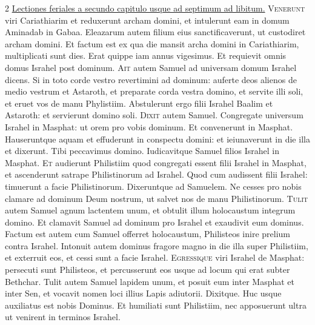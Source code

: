 \begin{multicols*}{2}
\newline \ul{Lectiones feriales a secundo capitulo usque ad septimum ad libitum.}
{\color{Red} }
\lettrine[lines=2]{\zallmancaps \color{Blue} V}{enerunt} viri Cariathiarim et reduxerunt archam domini, et intulerunt eam in domum Aminadab in Gabaa. Eleazarum autem filium eius sanctificaverunt, ut custodiret archam domini. Et factum est ex qua die mansit archa domini in Cariathiarim, multiplicati sunt dies. Erat quippe iam annus vigesimus. Et requievit omnis domus Israhel post dominum.%
\lettrine[lines=2]{\zallmancaps \color{Red} A}{it} autem Samuel ad universam domum Israhel dicens. Si in toto corde vestro revertimini ad dominum: auferte deos alienos de medio vestrum et Astaroth, et preparate corda vestra domino, et servite illi soli, et eruet vos de manu Phylistiim. Abstulerunt ergo filii Israhel Baalim et Astaroth: et servierunt domino soli.
\lettrine[lines=2]{\zallmancaps \color{Blue} D}{ixit} autem Samuel. Congregate universum Israhel in Masphat: ut orem pro vobis dominum. Et convenerunt in Masphat. Hauseruntque aquam et effuderunt in conspectu domini: et ieiunaverunt in die illa et dixerunt. Tibi peccavimus domino. Iudicavitque Samuel filios Israhel in Masphat.
\lettrine[lines=2]{\zallmancaps \color{Red} E}{t} audierunt Philistiim quod congregati essent filii Israhel in Masphat, et ascenderunt satrape Philistinorum ad Israhel. Quod cum audissent filii Israhel: timuerunt a facie Philistinorum. Dixeruntque ad Samuelem. Ne cesses pro nobis clamare ad dominum Deum nostrum, ut salvet nos de manu Philistinorum.
\lettrine[lines=2]{\zallmancaps \color{Blue} T}{ulit} autem Samuel agnum lactentem unum, et obtulit illum holocaustum integrum domino. Et clamavit Samuel ad dominum pro Israhel et exaudivit eum dominus. Factum est autem cum Samuel offerret holocaustum, Philisteos inire prelium contra Israhel. Intonuit autem dominus fragore magno in die illa super Philistiim, et exterruit eos, et cessi sunt a facie Israhel.
\lettrine[lines=2]{\zallmancaps \color{Red} E}{gressique} viri Israhel de Masphat: persecuti sunt Philisteos, et percusserunt eos usque ad locum qui erat subter Bethchar. Tulit autem Samuel lapidem unum, et posuit eum inter Masphat et inter Sen, et vocavit nomen loci illius Lapis adiutorii. Dixitque. Huc usque auxiliatus est nobis Dominus. Et humiliati sunt Philistiim, nec apposuerunt ultra ut venirent in terminos Israhel.

\end{multicols*}

